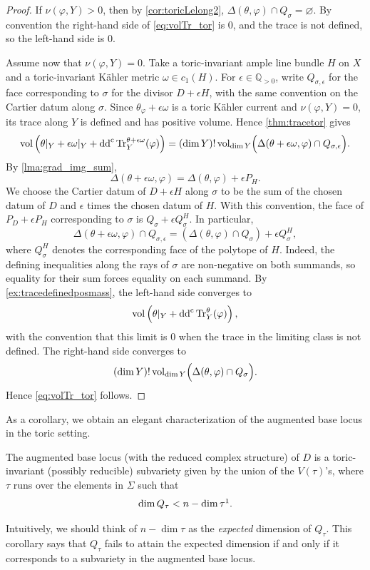 \begin{proof}
    If $\nu(\varphi,Y)>0$, then by \cref{cor:toricLelong2}, $\Delta(\theta,\varphi)\cap Q_\sigma=\varnothing$. By convention the right-hand side of \eqref{eq:volTr_tor} is $0$, and the trace is not defined, so the left-hand side is $0$.

    Assume now that $\nu(\varphi,Y)=0$.
    Take a toric-invariant ample line bundle $H$ on $X$ and a toric-invariant Kähler metric $\omega\in c_1(H)$. For $\epsilon\in \mathbb{Q}_{>0}$, write $Q_{\sigma,\epsilon}$ for the face corresponding to $\sigma$ for the divisor $D+\epsilon H$, with the same convention on the Cartier datum along $\sigma$. Since $\theta_{\varphi}+\epsilon\omega$ is a toric Kähler current and $\nu(\varphi,Y)=0$, its trace along $Y$ is defined and has positive volume. Hence \cref{thm:tracetor} gives
    \[
    \operatorname{vol} \left(\theta|_Y+\epsilon\omega|_Y+\mathrm{dd}^{\mathrm{c}} \operatorname{Tr}_Y^{\theta+\epsilon\omega}(\varphi)\right)= (\dim Y)!\operatorname{vol}_{\dim Y} \Bigl(\Delta(\theta+\epsilon\omega,\varphi)\cap Q_{\sigma,\epsilon}\Bigr).
    \]
    By \cref{lma:grad_img_sum},
    \[
        \Delta(\theta+\epsilon\omega,\varphi)=\Delta(\theta,\varphi)+\epsilon P_H.
    \]
    We choose the Cartier datum of $D+\epsilon H$ along $\sigma$ to be the sum of the chosen datum of $D$ and $\epsilon$ times the chosen datum of $H$. With this convention, the face of $P_D+\epsilon P_H$ corresponding to $\sigma$ is $Q_\sigma+\epsilon Q_\sigma^H$. In particular,
    \[
        \Delta(\theta+\epsilon\omega,\varphi)\cap Q_{\sigma,\epsilon}=(\Delta(\theta,\varphi)\cap Q_{\sigma})+\epsilon Q^H_{\sigma},
    \]
    where $Q^H_{\sigma}$ denotes the corresponding face of the polytope of $H$. Indeed, the defining inequalities along the rays of $\sigma$ are non-negative on both summands, so equality for their sum forces equality on each summand. By \cref{ex:tracedefinedposmass}, the left-hand side converges to
    \[
        \operatorname{vol}\left(\theta|_Y+\mathrm{dd}^{\mathrm{c}}\operatorname{Tr}_Y^\theta(\varphi)\right),
    \]
    with the convention that this limit is $0$ when the trace in the limiting class is not defined. The right-hand side converges to
    \[
        (\dim Y)!\operatorname{vol}_{\dim Y}\Bigl(\Delta(\theta,\varphi)\cap Q_\sigma\Bigr).
    \]
    Hence \eqref{eq:volTr_tor} follows.
\end{proof}

As a corollary, we obtain an elegant characterization of the augmented base locus in the toric setting.
\begin{corollary}\label{cor:augbl}
    The augmented base locus (with the reduced complex structure) of $D$ is a toric-invariant (possibly reducible) subvariety given by the union of the $V(\tau)$'s, where $\tau$ runs over the elements in $\Sigma$ such that
    \[
    \dim Q_{\tau}<n-\dim \tau\footnotemark.
    \]
\end{corollary}
Intuitively, we should think of $n-\dim \tau$ as the \emph{expected} dimension of $Q_{\tau}$. This corollary says that $Q_{\tau}$ fails to attain the expected dimension if and only if it corresponds to a subvariety in the augmented base locus.

